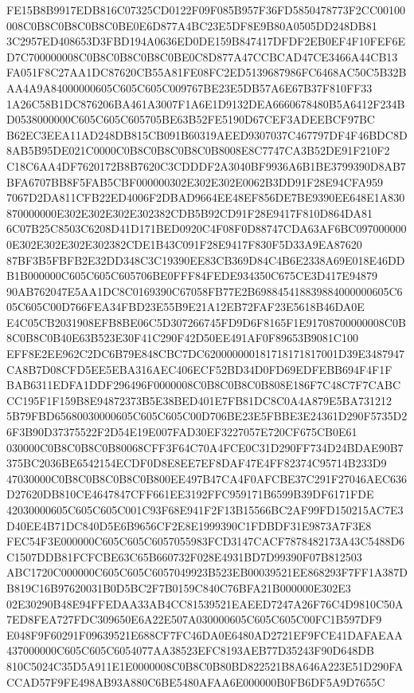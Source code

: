 \documentclass[UTF8,fontset=fandol,zihao=-4,a4paper]{ctexart}
\begin{document}
{{FE15B8B9917EDB816C07325CD0122F09F085B957F36FD5850478773F2CC00100008C0B8C0B8C0B8C0BE0E6D877A4BC23E5DF8E9B80A0505DD248DB81
3C2957ED408653D3FBD194A0636ED0DE159B847417DFDF2EB0EF4F10FEF6ED7C700000008C0B8C0B8C0B8C0BE0C8D877A47CCBCAD47CE3466A44CB13
FA051F8C27AA1DC87620CB55A81FE08FC2ED5139687986FC6468AC50C5B32BAA4A9A84000000605C605C605C009767BE23E5DB57A6E67B37F810FF33
1A26C58B1DC876206BA461A3007F1A6E1D9132DEA6660678480B5A6412F234BD0538000000C605C605C605705BE63B52FE5190D67CEF3ADEEBCF97BC
B62EC3EEA11AD248DB815CB091B60319AEED9307037C467797DF4F46BDC8D8AB5B95DE021C0000C0B8C0B8C0B8C0B8008E8C7747CA3B52DE91F210F2
C18C6AA4DF7620172B8B7620C3CDDDF2A3040BF9936A6B1BE3799390D8AB7BFA6707BB8F5FAB5CBF000000302E302E302E0062B3DD91F28E94CFA959
7067D2DA811CFB22ED4006F2DBAD9664EE48EF856DE7BE9390EE648E1A830870000000E302E302E302E302382CDB5B92CD91F28E9417F810D864DA81
6C07B25C8503C6208D41D171BED0920C4F08F0D88747CDA63AF6BC0970000000E302E302E302E302382CDE1B43C091F28E9417F830F5D33A9EA87620
87BF3B5FBFB2E32DD348C3C19390EE83CB369D84C4B6E2338A69E018E46DDB1B000000C605C605C605706BE0FFF84FEDE934350C675CE3D417E94879
90AB762047E5AA1DC8C0169390C67058FB77E2B698845418839884000000605C605C605C00D766FEA34FBD23E55B9E21A12EB72FAF23E5618B46DA0E
E4C05CB2031908EFB8BE06C5D307266745FD9D6F8165F1E91708700000008C0B8C0B8C0B40E63B523E30F41C290F42D50EE491AF0F89653B9081C100
EFF8E2EE962C2DC6B79E848CBC7DC620000000181718171817001D39E3487947CA8B7D08CFD5EE5EBA316AEC406ECF52BD34D0FD69EDFEBB694F4F1F
BAB6311EDFA1DDF296496F0000008C0B8C0B8C0B808E186F7C48C7F7CABCCC195F1F159B8E94872373B5E38BED401E7FB81DC8C0A4A879E5BA731212
5B79FBD65680030000605C605C605C00D706BE23E5FBBE3E24361D290F5735D26F3B90D37375522F2D54E19E007FAD30EF3227057E720CF675CB0E61
030000C0B8C0B8C0B80068CFF3F64C70A4FCE0C31D290FF734D24BDAE90B7375BC2036BE6542154ECDF0D8E8EE7EF8DAF47E4FF82374C95714B233D9
47030000C0B8C0B8C0B8C0B800EE497B47CA4F0AFCBE37C291F27046AEC636D27620DB810CE4647847CFF661EE3192FFC959171B6599B39DF6171FDE
42030000605C605C605C001C93F68E941F2F13B15566BC2AF99FD150215AC7E3D40EE4B71DC840D5E6B9656CF2E8E1999390C1FDBDF31E9873A7F3E8
FEC54F3E000000C605C605C6057055983FCD3147CACF7878482173A43C5488D6C1507DDB81FCFCBE63C65B660732F028E4931BD7D99390F07B812503
ABC1720C000000C605C605C6057049923B523EB00039521EE868293F7FF1A387DB819C16B97620031B0D5BC2F7B0159C840C76BFA21B000000E302E3
02E30290B48E94FFEDAA33AB4CC81539521EAEED7247A26F76C4D9810C50A7ED8FEA727FDC309650E6A22E507A030000605C605C605C00FC1B597DF9
E048F9F60291F09639521E688CF7FC46DA0E6480AD2721EF9FCE41DAFAEAA437000000C605C605C6054077AA38523EFC8193AEB77D35243F90D648DB
810C5024C35D5A911E1E0000008C0B8C0B80BD822521B8A646A223E51D290FACCAD57F9FE498AB93A880C6BE5480AFAA6E000000B0FB6DF5A9D7655C
}}
\end{document}

